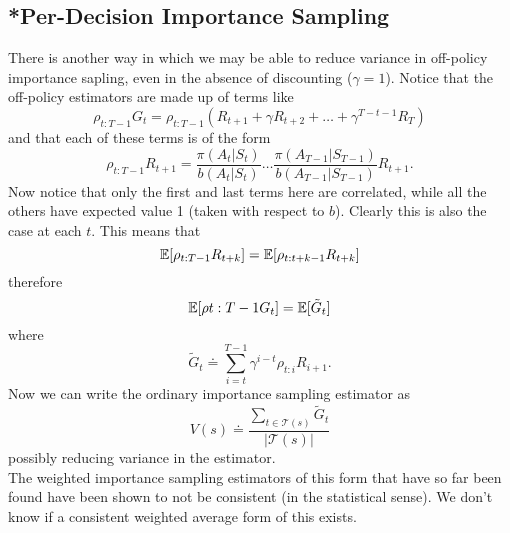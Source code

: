 \subsection{*Per-Decision Importance Sampling}
There is another way in which we may be able to reduce variance in off-policy importance sapling, even in the absence of discounting ($\gamma = 1$). Notice that the off-policy estimators are made up of terms like
\[
    \rho_{t:T-1}G_t = \rho_{t:T-1} (R_{t+1} + \gamma R_{t+2} + \dots+ \gamma^{T-t-1}R_{T})
\]
and that each of these terms is of the form
\[
    \rho_{t:T-1}R_{t+1} = \frac{\pi(A_t|S_t)}{b(A_t|S_t)}\dots\frac{\pi(A_{T-1}|S_{T-1})}{b(A_{T-1}|S_{T-1})}R_{t+1}.
\]
Now notice that only the first and last terms here are correlated, while all the others have expected value 1 (taken with respect to $b$). Clearly this is also the case at each $t$. This means that
\[
    \mathbb{E}{}[\rho_{t:T-1}R_{t+k}] = \mathbb{E}{}[\rho_{t:t+k-1}R_{t+k}]
\]
therefore
\[
    \mathbb{E}{}[\rho{t:T-1}G_t] = \mathbb{E}{}[\tilde{G}_t]
\]
where
\[
    \tilde{G}_t \doteq \sum_{i=t}^{T-1}\gamma^{i-t}\rho_{t:i}R_{i+1}.
\]
Now we can write the ordinary importance sampling estimator as
\[
    V(s) \doteq \frac{\sum_{t\in\mathcal{T}(s)} \tilde{G}_t}{|\mathcal{T}(s)|}
\]
possibly reducing variance in the estimator. \\

The weighted importance sampling estimators of this form that have so far been found have been shown to not be consistent (in the statistical sense). We don't know if a consistent weighted average form of this exists.
